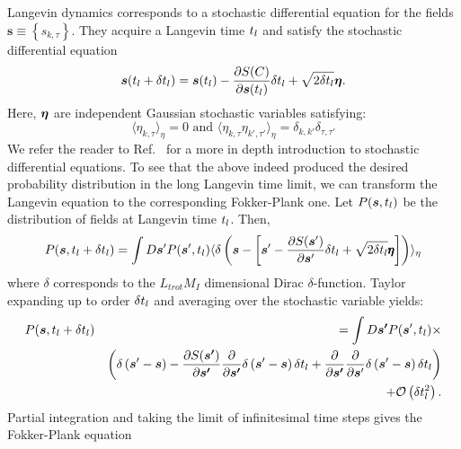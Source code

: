 Langevin dynamics  corresponds to a  stochastic differential equation   for the fields  $\pmb{s} \equiv \left\{s_{k,\tau} \right\}$. They acquire a Langevin time $t_{l}$  and satisfy the stochastic differential equation
\begin{equation}
   \boldsymbol{s}(t_{l} +  \delta t_{l})    =    \boldsymbol{s}(t_{l})    - \frac{\partial S(C) }{\partial    \boldsymbol{s}(t_{l}) }    \delta t_{l}     +\sqrt{2 \delta t_{l} } \boldsymbol{\eta}.
\end{equation}
Here, $  \boldsymbol{\eta}  $   are  independent Gaussian  stochastic variables  satisfying:
\begin{equation}
        \langle  \eta_{k,\tau} \rangle_{\eta}  = 0   \text{  and  }    \langle  \eta_{k,\tau}  \eta_{k',\tau'} \rangle_{\eta}  = \delta_{k,k'} \delta_{\tau,\tau'}
\end{equation}
We refer the reader to  Ref.~\cite{Gardiner}   for a more in depth introduction to stochastic differential equations.
To see that the above  indeed produced the desired probability distribution in the long Langevin time limit, we can transform the Langevin equation  to the corresponding Fokker-Plank one.  Let
$P(\boldsymbol{s}, t_{l}) $ be the distribution of fields at Langevin time $t_{l}$. Then,
\begin{equation}
        P(\boldsymbol{s}, t_{l}  + \delta t_{l} )    = \int D\boldsymbol{s}'  P  (\boldsymbol{s}', t_{l}  )    \langle    \delta \left(  \boldsymbol{s} - \left[ \boldsymbol{s}'   - \frac{\partial S(\boldsymbol{s}' )}{\partial    \boldsymbol{s}' }   \delta t_{l}     +\sqrt{2 \delta t_{l} } \pmb{\eta}  \right]    \right) \rangle_{\eta}
\end{equation}
where $\delta$ corresponds to the $L_{trot} M_I $  dimensional Dirac $\delta$-function.   Taylor expanding  up to order $\delta t_{l}$  and averaging over the stochastic variable yields:
\begin{eqnarray}
P(\boldsymbol{s}, t_{l}  + \delta t_{l} ) & &     = \int D\boldsymbol{s'}  P  (\boldsymbol{s}', t_{l}  )   \times  \\  & &  \left(   \delta \left(  \boldsymbol{s}' - \boldsymbol{s}   \right)
- \frac{\partial S(\boldsymbol{s'}) }{\partial    \boldsymbol{s'} }   \frac{\partial  }{\partial    \boldsymbol{s'} } \delta \left(  \boldsymbol{s}' - \boldsymbol{s} \right)  \delta t_{l}   +
   \frac{\partial  }{\partial    \boldsymbol{s'} }   \frac{\partial  }{\partial    \boldsymbol{s}' }  \delta \left(  \boldsymbol{s}' - \boldsymbol{s}\right)    \delta t_{l}
\right)  \nonumber   \\
  &&   + {\cal O}  \left(  \delta t_{l}^2 \right) \nonumber.
\end{eqnarray}
Partial integration  and taking the limit of infinitesimal time steps   gives the Fokker-Plank equation
